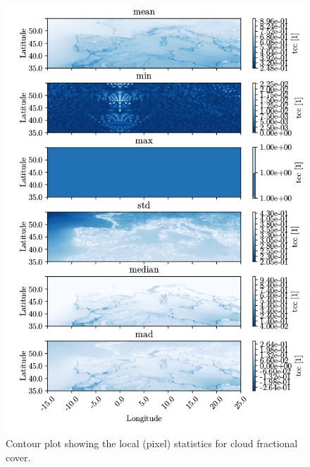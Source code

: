\begin{figure}[ht]
    \centering
    \includegraphics{python_figs/all_stat_variable_tcc.png}
    \caption{Contour plot showing the local (pixel) statistics for cloud fractional cover.}
    \label{fig:all_stats_tcc}
\end{figure}

